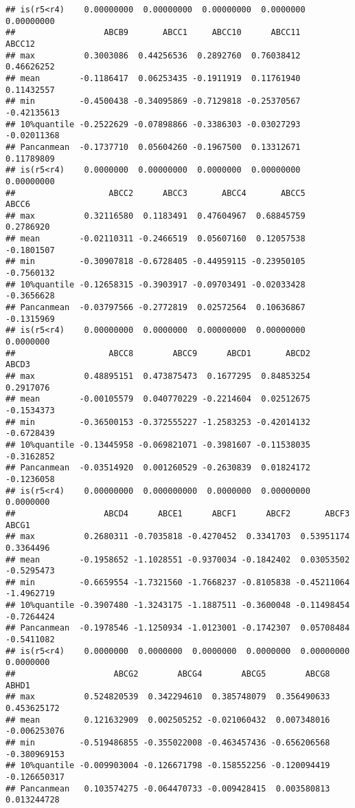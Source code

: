 \documentclass[
]{article}
\begin{document}
\begin{verbatim}
## is(r5<r4)    0.00000000  0.00000000  0.00000000  0.0000000  0.00000000
##                  ABCB9       ABCC1     ABCC10      ABCC11      ABCC12
## max          0.3003086  0.44256536  0.2892760  0.76038412  0.46626252
## mean        -0.1186417  0.06253435 -0.1911919  0.11761940  0.11432557
## min         -0.4500438 -0.34095869 -0.7129818 -0.25370567 -0.42135613
## 10%quantile -0.2522629 -0.07898866 -0.3386303 -0.03027293 -0.02011368
## Pancanmean  -0.1737710  0.05604260 -0.1967500  0.13312671  0.11789809
## is(r5<r4)    0.0000000  0.00000000  0.0000000  0.00000000  0.00000000
##                   ABCC2      ABCC3       ABCC4       ABCC5      ABCC6
## max          0.32116580  0.1183491  0.47604967  0.68845759  0.2786920
## mean        -0.02110311 -0.2466519  0.05607160  0.12057538 -0.1801507
## min         -0.30907818 -0.6728405 -0.44959115 -0.23950105 -0.7560132
## 10%quantile -0.12658315 -0.3903917 -0.09703491 -0.02033428 -0.3656628
## Pancanmean  -0.03797566 -0.2772819  0.02572564  0.10636867 -0.1315969
## is(r5<r4)    0.00000000  0.0000000  0.00000000  0.00000000  0.0000000
##                   ABCC8        ABCC9      ABCD1       ABCD2      ABCD3
## max          0.48895151  0.473875473  0.1677295  0.84853254  0.2917076
## mean        -0.00105579  0.040770229 -0.2214604  0.02512675 -0.1534373
## min         -0.36500153 -0.372555227 -1.2583253 -0.42014132 -0.6728439
## 10%quantile -0.13445958 -0.069821071 -0.3981607 -0.11538035 -0.3162852
## Pancanmean  -0.03514920  0.001260529 -0.2630839  0.01824172 -0.1236058
## is(r5<r4)    0.00000000  0.000000000  0.0000000  0.00000000  0.0000000
##                  ABCD4      ABCE1      ABCF1      ABCF2       ABCF3      ABCG1
## max          0.2680311 -0.7035818 -0.4270452  0.3341703  0.53951174  0.3364496
## mean        -0.1958652 -1.1028551 -0.9370034 -0.1842402  0.03053502 -0.5295473
## min         -0.6659554 -1.7321560 -1.7668237 -0.8105838 -0.45211064 -1.4962719
## 10%quantile -0.3907480 -1.3243175 -1.1887511 -0.3600048 -0.11498454 -0.7264424
## Pancanmean  -0.1978546 -1.1250934 -1.0123001 -0.1742307  0.05708484 -0.5411082
## is(r5<r4)    0.0000000  0.0000000  0.0000000  0.0000000  0.00000000  0.0000000
##                    ABCG2        ABCG4        ABCG5        ABCG8        ABHD1
## max          0.524820539  0.342294610  0.385748079  0.356490633  0.453625172
## mean         0.121632909  0.002505252 -0.021060432  0.007348016 -0.006253076
## min         -0.519486855 -0.355022008 -0.463457436 -0.656206568 -0.380969153
## 10%quantile -0.009903004 -0.126671798 -0.158552256 -0.120094419 -0.126650317
## Pancanmean   0.103574275 -0.064470733 -0.009428415  0.003580813  0.013244728

\end{verbatim}
\end{document}
